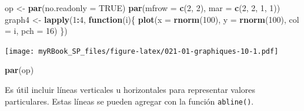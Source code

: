 \documentclass[
]{book}
\newenvironment{Shaded}{\begin{snugshade}}{\end{snugshade}}
\newcommand{\ControlFlowTok}[1]{\textcolor[rgb]{0.13,0.29,0.53}{\textbf{#1}}}
\newcommand{\DataTypeTok}[1]{\textcolor[rgb]{0.13,0.29,0.53}{#1}}
\newcommand{\DecValTok}[1]{\textcolor[rgb]{0.00,0.00,0.81}{#1}}
\newcommand{\KeywordTok}[1]{\textcolor[rgb]{0.13,0.29,0.53}{\textbf{#1}}}
\newcommand{\NormalTok}[1]{#1}
\newcommand{\OperatorTok}[1]{\textcolor[rgb]{0.81,0.36,0.00}{\textbf{#1}}}
\newcommand{\OtherTok}[1]{\textcolor[rgb]{0.56,0.35,0.01}{#1}}
\newcommand{\StringTok}[1]{\textcolor[rgb]{0.31,0.60,0.02}{#1}}
\begin{document}
\begin{Shaded}
\begin{Highlighting}[]
\NormalTok{op <-}\StringTok{ }\KeywordTok{par}\NormalTok{(}\DataTypeTok{no.readonly =} \OtherTok{TRUE}\NormalTok{)}
\KeywordTok{par}\NormalTok{(}\DataTypeTok{mfrow =} \KeywordTok{c}\NormalTok{(}\DecValTok{2}\NormalTok{, }\DecValTok{2}\NormalTok{), }\DataTypeTok{mar =} \KeywordTok{c}\NormalTok{(}\DecValTok{2}\NormalTok{, }\DecValTok{2}\NormalTok{, }\DecValTok{1}\NormalTok{, }\DecValTok{1}\NormalTok{))}
\NormalTok{graph4 <-}\StringTok{ }\KeywordTok{lapply}\NormalTok{(}\DecValTok{1}\OperatorTok{:}\DecValTok{4}\NormalTok{, }\ControlFlowTok{function}\NormalTok{(i)\{}
  \KeywordTok{plot}\NormalTok{(}\DataTypeTok{x =} \KeywordTok{rnorm}\NormalTok{(}\DecValTok{100}\NormalTok{), }
    \DataTypeTok{y =} \KeywordTok{rnorm}\NormalTok{(}\DecValTok{100}\NormalTok{), }
    \DataTypeTok{col =}\NormalTok{ i, }\DataTypeTok{pch =} \DecValTok{16}\NormalTok{)}
\NormalTok{\})}
\end{Highlighting}
\end{Shaded}

\texttt{[image: myRBook\_SP\_files/figure-latex/021-01-graphiques-10-1.pdf]}

\begin{Shaded}
\begin{Highlighting}[]
\KeywordTok{par}\NormalTok{(op)}
\end{Highlighting}
\end{Shaded}

Es útil incluir líneas verticales u horizontales para representar valores particulares. Estas líneas se pueden agregar con la función \texttt{abline()}.
\end{document}
